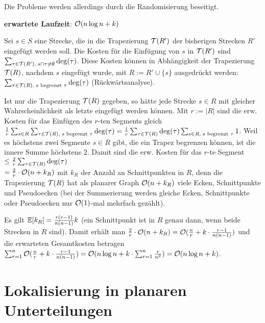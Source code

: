 Die Probleme werden allerdings durch die Randomisierung beseitigt.

\linie
\pagebreak

\textbf{erwartete Laufzeit}:
$\mathcal{O}(n \log n + k)$

\begin{Beweis}
    Sei $s \in S$ eine Strecke, die in die Trapezierung $\mathcal{T}(R')$ der bisherigen Strecken
    $R'$ eingefügt werden soll.
    Die Kosten für die Einfügung von $s$ in $\mathcal{T}(R')$ sind
    $\sum_{\tau \in \mathcal{T}(R'),\; s \cap \tau \not= \emptyset} \deg(\tau)$.
    Diese Kosten können in Abhängigkeit der Trapezierung $\mathcal{T}(R)$, nachdem $s$ eingefügt wurde,
    mit $R := R' \cup \{s\}$ ausgedrückt werden:
    $\sum_{\tau \in \mathcal{T}(R),\; s \text{ begrenzt } \tau} \deg(\tau)$
    (Rückwärtsanalyse).

    Ist nur die Trapezierung $\mathcal{T}(R)$ gegeben, so hätte jede Strecke $s \in R$ mit gleicher
    Wahrscheinlichkeit als letzte eingefügt werden können.
    Mit $r := |R|$ sind die erw. Kosten für das Einfügen des $r$-ten Segments gleich
    $\frac{1}{r} \sum_{s \in R} \sum_{\tau \in \mathcal{T}(R),\; s \text{ begrenzt } \tau} \deg(\tau)
    = \frac{1}{r} \sum_{\tau \in \mathcal{T}(R)} \deg(\tau) \sum_{s \in R,\; s \text{ begrenzt } \tau} 1$.
    Weil es höchstens zwei Segmente $s \in R$ gibt, die ein Trapez begrenzen können, ist
    die innere Summe höchstens $2$.
    Damit sind die erw. Kosten für das $r$-te Segment
    $\le \frac{2}{r} \sum_{\tau \in \mathcal{T}(R)} \deg(\tau)$\\
    $= \frac{2}{r} \cdot \mathcal{O}(n + k_R)$ mit $k_R$ der Anzahl an Schnittpunkten in $R$,
    denn die Trapezierung $\mathcal{T}(R)$ hat als planarer Graph $\mathcal{O}(n + k_R)$ viele Ecken, Schnittpunkte
    und Pseudoecken
    (bei der Summerierung werden gleiche Ecken, Schnittpunkte oder Pseudoecken nur $\mathcal{O}(1)$-mal
    mehrfach gezählt).

    Es gilt $\mathbb{E}[k_R] = \frac{r(r-1)}{n(n-1)} k$
    (ein Schnittpunkt ist in $R$ genau dann, wenn beide Strecken in $R$ sind).
    Damit erhält man $\frac{2}{r} \cdot \mathcal{O}(n + k_R)
    = \mathcal{O}(\frac{n}{r} + k \cdot \frac{r - 1}{n(n-1)})$
    und die erwarteten Gesamtkosten betragen
    $\sum_{r=1}^n \mathcal{O}(\frac{n}{r} + k \cdot \frac{r - 1}{n(n-1)})
    = \mathcal{O}(n \log n + k \cdot \sum_{r=1}^n \frac{r}{n^2}) = \mathcal{O}(n \log n + k)$.
\end{Beweis}

\section{%
    Lokalisierung in planaren Unterteilungen%
}

